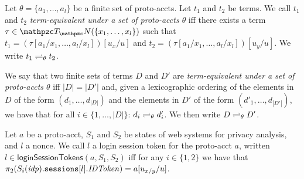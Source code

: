   \begin{definition}
    Let $\theta = \{a_1, \ldots, a_l \}$ be a finite set of proto-accts.
    Let $t_1$ and $t_2$ be terms. We call $t_1$ and $t_2$
    \emph{term-equivalent under a set of proto-accts $\theta$} 
    iff there exists a term $\tau \in \terms(\{x_1,\dots,x_l\})$ such that
    $t_1 = (\tau [ a_1 / x_1 , \dots , a_l / x_l ])[ u_x / u ]$ and
    $t_2 = (\tau [ a_1 / x_1 , \dots , a_l / x_l ])[ u_y / u ]$.
    We write $t_1 \rightleftharpoons_{\theta} t_2$.
  
    We say that two finite sets of terms $D$ and $D'$ are
    \emph{term-equivalent under a set of proto-accts $\theta$} 
    iff $|D| = |D'|$ and, given a lexicographic ordering of the 
    elements in $D$ of the form $(d_1,\dots,d_{|D|})$ and the 
    elements in $D'$ of the form $(d'_1,\dots,d_{|D'|})$, we 
    have that for all 
    $i \in \{1,\dots,|D|\}$: $d_i \rightleftharpoons_{\theta} d'_i$. 
    We then write $D \rightleftharpoons_{\theta} D'$.
  \end{definition}

  \begin{definition}
    Let $a$ be a proto-acct, $S_1$ and $S_2$ be states of \uppresso web systems for privacy analysis, and $l$ a nonce. 
    We call $l$ a login session token for the proto-acct $a$, written $l \in \mathsf{loginSessionTokens}(a,S_1,S_2)$ 
    iff for any $i \in \{1,2\}$ we have that $\pi_{2}({S_i(\mathit{idp}).\mathtt{sessions}[l].\mathit{IDToken}}) = a[u_{x/y}/u]$.
  \end{definition}
  
